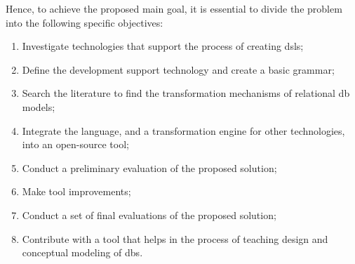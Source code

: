 Hence, to achieve the proposed main goal, it is essential to divide the problem into the following specific objectives:

\begin{enumerate}[label={\arabic*)}]
     \item Investigate technologies that support the process of creating \acp{dsl};
     \item Define the development support technology and create a basic grammar;
     \item Search the literature to find the transformation mechanisms of relational \ac{db} models;
     \item Integrate the language, and a transformation engine for other technologies, into an open-source tool;
     \item Conduct a preliminary evaluation of the proposed solution;
     \item Make tool improvements;
     \item Conduct a set of final evaluations of the proposed solution;
     \item Contribute with a tool that helps in the process of teaching design and conceptual modeling of \acp{db}.
\end{enumerate}

